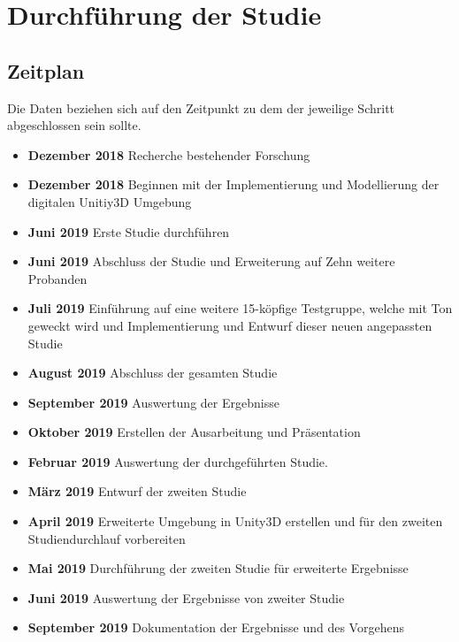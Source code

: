 \chapter{Durchführung der Studie}

\section{Zeitplan}
Die Daten beziehen sich auf den Zeitpunkt zu dem der jeweilige Schritt abgeschlossen sein sollte.
\begin{itemize}
    \item \textbf{Dezember 2018} Recherche bestehender Forschung
    \item \textbf{Dezember 2018} Beginnen mit der Implementierung und Modellierung der digitalen Unitiy3D Umgebung %
    \item \textbf{Juni 2019} Erste Studie durchführen
    \item \textbf{Juni 2019} Abschluss der Studie und Erweiterung auf Zehn weitere Probanden
    \item \textbf{Juli 2019} Einführung auf eine weitere 15-köpfige Testgruppe, welche mit Ton geweckt wird und Implementierung und Entwurf dieser neuen angepassten Studie
    \item \textbf{August 2019} Abschluss der gesamten Studie
    \item \textbf{September 2019} Auswertung der Ergebnisse
    \item \textbf{Oktober 2019} Erstellen der Ausarbeitung und Präsentation
    
    
    
    
    
    
    \item \textbf{Februar 2019} Auswertung der durchgeführten Studie.
    \item \textbf{März 2019} Entwurf der zweiten Studie
    \item \textbf{April 2019} Erweiterte Umgebung in Unity3D erstellen und für den zweiten Studiendurchlauf vorbereiten
    \item \textbf{Mai 2019} Durchführung der zweiten Studie für erweiterte Ergebnisse
    \item \textbf{Juni 2019} Auswertung der Ergebnisse von zweiter Studie
    \item \textbf{September 2019} Dokumentation der Ergebnisse und des Vorgehens
\end{itemize}
